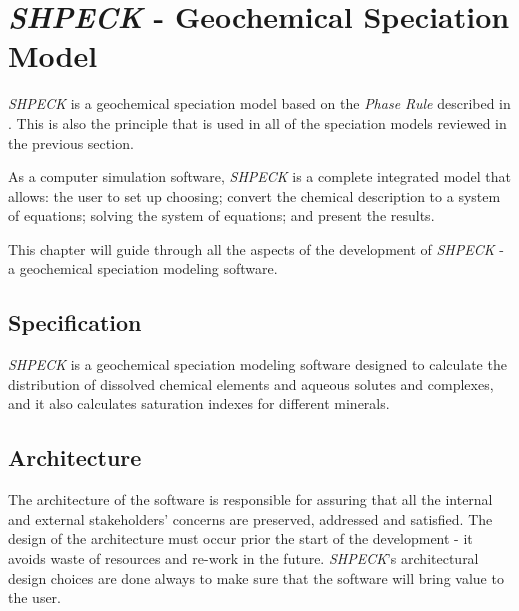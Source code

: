 
\chapter{\emph{SHPECK} - Geochemical Speciation Model}
\label{chapter:SHPECK}

\emph{SHPECK} is a geochemical speciation model based on the \emph{Phase Rule} described in \cite{Garrels:65}. This is also the principle that is used in all of the speciation models reviewed in the previous section. 

As a computer simulation software, \emph{SHPECK} is a complete integrated model that allows: the user to set up choosing; convert the chemical description to a system of equations; solving the system of equations; and present the results.

This chapter will guide through all the aspects of the development of \emph{SHPECK} - a geochemical speciation modeling software. 

\section{Specification}
\emph{SHPECK} is a geochemical speciation modeling software designed to calculate the distribution of dissolved chemical elements and aqueous solutes and complexes, and it also calculates saturation indexes for different minerals. 

\section{Architecture}
The architecture of the software is responsible for assuring that all the internal and external stakeholders' concerns are preserved, addressed and satisfied. The design of the architecture must occur prior the start of the development - it avoids waste of resources and re-work in the future. \emph{SHPECK}'s architectural design choices are done always to make sure that the software will bring value to the user.


